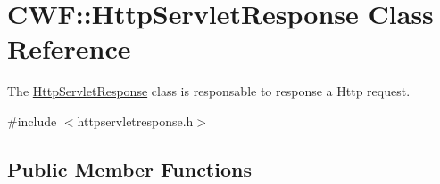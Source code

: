 \hypertarget{class_c_w_f_1_1_http_servlet_response}{\section{C\+W\+F\+:\+:Http\+Servlet\+Response Class Reference}
\label{class_c_w_f_1_1_http_servlet_response}
}


The \hyperlink{class_c_w_f_1_1_http_servlet_response}{Http\+Servlet\+Response} class is responsable to response a Http request.  




{\ttfamily \#include $<$httpservletresponse.\+h$>$}

\subsection*{Public Member Functions}
